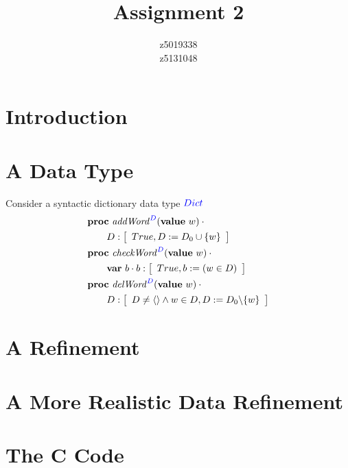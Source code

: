 \documentclass[headings=small,a4paper,12pt]{scrartcl}
\title{Assignment 2}
\author{z5019338\\z5131048}
\newcommand{\mylist}[1]{\langle #1\rangle}
\newcommand{\addWord}{\mathit{addWord}\xspace}
\newcommand{\checkWord}{\mathit{checkWord}\xspace}
\newcommand{\delWord}{\mathit{delWord}\xspace}
\begin{document}
\maketitle

\section{Introduction}
\label{sec:introduction}


\section{A Data Type}
\label{sec:abstract-data-type}

Consider a syntactic dictionary data type ${\color{blue}Dict}$
\begin{align*}
	  & \PROC~\addWord^{\color{blue}D}(\VALUE~w)\cdot{} \\
	  & \qquad D:\left[                                 
	\begin{array}{l}
	True, D\Ass D_0 \cup \lbrace w \rbrace
	\end{array}  
	\right]\\
& \PROC~\checkWord^{\color{blue}D}(\VALUE~w)\cdot{} \\
& \qquad \VAR~b\cdot{}b:\left[                                 
	\begin{array}{l}
		True, b\Ass (w\in D)
	\end{array}  
\right]\\
& \PROC~\delWord^{\color{blue}D}(\VALUE~w)\cdot{} \\
& \qquad D:\left[                                 
	\begin{array}{l}
		D \neq \mylist{ } \AND w \in D, D \Ass D_0 \backslash \lbrace w \rbrace 
	\end{array}  
\right]\\
\end{align*}


\section{A Refinement}
\label{sec:a-Refinement}


\section{A More Realistic Data Refinement}
\label{sec:a-more-realistic-data-refinement}
\section{The C Code}
\label{sec:code}

\end{document}

